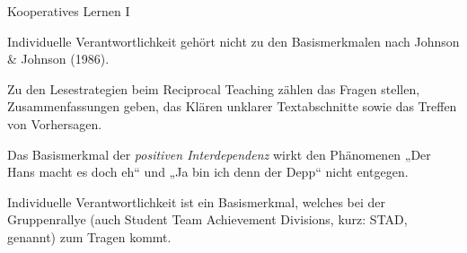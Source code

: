 \begin{multiple-choice}{Kooperatives Lernen I}
    \begin{answers}
        \item[\correct] Individuelle Verantwortlichkeit gehört nicht zu den Basismerkmalen nach Johnson \& Johnson (1986).
        \item[\correct] Zu den Lesestrategien beim Reciprocal Teaching zählen das Fragen stellen, Zusammenfassungen geben, das Klären unklarer Textabschnitte sowie das Treffen von Vorhersagen.
        \item[\wrong] Das Basismerkmal der \textit{positiven Interdependenz} wirkt den Phänomenen „Der Hans macht es doch eh“ und „Ja bin ich denn der Depp“ nicht entgegen.
        \item[\wrong] Individuelle Verantwortlichkeit ist ein Basismerkmal, welches bei der Gruppenrallye (auch Student Team Achievement Divisions, kurz: STAD, genannt) zum Tragen kommt.
    \end{answers}
\end{multiple-choice}
